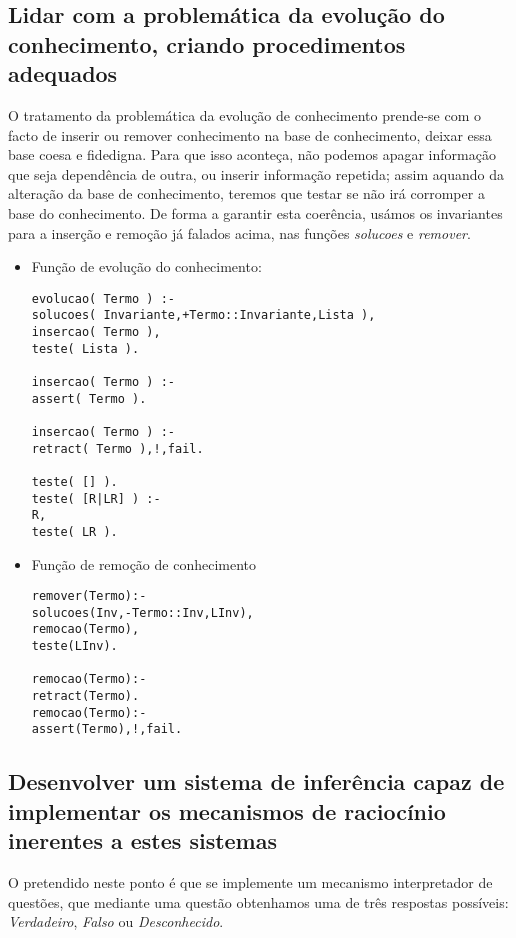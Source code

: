 \subsection{Lidar com a problemática da evolução do conhecimento, criando procedimentos adequados}

O tratamento da problemática da evolução de conhecimento prende-se com o facto de inserir ou remover conhecimento na base de conhecimento, deixar essa base coesa e fidedigna. Para que isso aconteça, não podemos apagar informação que seja dependência de outra, ou inserir informação repetida; assim aquando da alteração da base de conhecimento, teremos que testar se não irá corromper a base do conhecimento. De forma a garantir esta coerência, usámos os invariantes para a inserção e remoção já falados acima, nas funções \textit{solucoes} e \textit{remover}. 

\begin{itemize}
\item Função de evolução do conhecimento: 
\begin{verbatim}
evolucao( Termo ) :-
solucoes( Invariante,+Termo::Invariante,Lista ),
insercao( Termo ),
teste( Lista ).

insercao( Termo ) :-
assert( Termo ).

insercao( Termo ) :-
retract( Termo ),!,fail.

teste( [] ).
teste( [R|LR] ) :-
R,
teste( LR ).
\end{verbatim}
\item Função de remoção de conhecimento

\begin{verbatim}
remover(Termo):-
solucoes(Inv,-Termo::Inv,LInv),
remocao(Termo),
teste(LInv).

remocao(Termo):-
retract(Termo).
remocao(Termo):-
assert(Termo),!,fail.
\end{verbatim}

\end{itemize}

\subsection{Desenvolver um sistema de inferência capaz de implementar os mecanismos de raciocínio inerentes a estes sistemas}

O pretendido neste ponto é que se implemente um mecanismo interpretador de questões, que mediante uma questão obtenhamos uma de três respostas possíveis: \textit{Verdadeiro}, \textit{Falso} ou \textit{Desconhecido}. 

